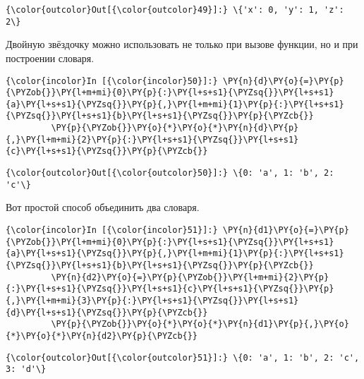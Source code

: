             \begin{Verbatim}[commandchars=\\\{\}]
{\color{outcolor}Out[{\color{outcolor}49}]:} \{'x': 0, 'y': 1, 'z': 2\}
\end{Verbatim}
        
    Двойную звёздочку можно использовать не только при вызове функции, но и
при построении словаря.

    \begin{Verbatim}[commandchars=\\\{\}]
{\color{incolor}In [{\color{incolor}50}]:} \PY{n}{d}\PY{o}{=}\PY{p}{\PYZob{}}\PY{l+m+mi}{0}\PY{p}{:}\PY{l+s+s1}{\PYZsq{}}\PY{l+s+s1}{a}\PY{l+s+s1}{\PYZsq{}}\PY{p}{,}\PY{l+m+mi}{1}\PY{p}{:}\PY{l+s+s1}{\PYZsq{}}\PY{l+s+s1}{b}\PY{l+s+s1}{\PYZsq{}}\PY{p}{\PYZcb{}}
         \PY{p}{\PYZob{}}\PY{o}{*}\PY{o}{*}\PY{n}{d}\PY{p}{,}\PY{l+m+mi}{2}\PY{p}{:}\PY{l+s+s1}{\PYZsq{}}\PY{l+s+s1}{c}\PY{l+s+s1}{\PYZsq{}}\PY{p}{\PYZcb{}}
\end{Verbatim}

            \begin{Verbatim}[commandchars=\\\{\}]
{\color{outcolor}Out[{\color{outcolor}50}]:} \{0: 'a', 1: 'b', 2: 'c'\}
\end{Verbatim}
        
    Вот простой способ объединить два словаря.

    \begin{Verbatim}[commandchars=\\\{\}]
{\color{incolor}In [{\color{incolor}51}]:} \PY{n}{d1}\PY{o}{=}\PY{p}{\PYZob{}}\PY{l+m+mi}{0}\PY{p}{:}\PY{l+s+s1}{\PYZsq{}}\PY{l+s+s1}{a}\PY{l+s+s1}{\PYZsq{}}\PY{p}{,}\PY{l+m+mi}{1}\PY{p}{:}\PY{l+s+s1}{\PYZsq{}}\PY{l+s+s1}{b}\PY{l+s+s1}{\PYZsq{}}\PY{p}{\PYZcb{}}
         \PY{n}{d2}\PY{o}{=}\PY{p}{\PYZob{}}\PY{l+m+mi}{2}\PY{p}{:}\PY{l+s+s1}{\PYZsq{}}\PY{l+s+s1}{c}\PY{l+s+s1}{\PYZsq{}}\PY{p}{,}\PY{l+m+mi}{3}\PY{p}{:}\PY{l+s+s1}{\PYZsq{}}\PY{l+s+s1}{d}\PY{l+s+s1}{\PYZsq{}}\PY{p}{\PYZcb{}}
         \PY{p}{\PYZob{}}\PY{o}{*}\PY{o}{*}\PY{n}{d1}\PY{p}{,}\PY{o}{*}\PY{o}{*}\PY{n}{d2}\PY{p}{\PYZcb{}}
\end{Verbatim}

            \begin{Verbatim}[commandchars=\\\{\}]
{\color{outcolor}Out[{\color{outcolor}51}]:} \{0: 'a', 1: 'b', 2: 'c', 3: 'd'\}
\end{Verbatim}
        
